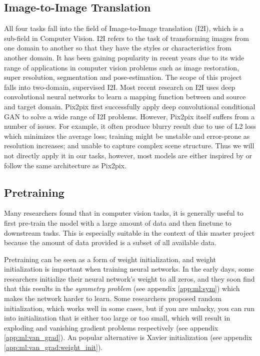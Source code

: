 \subsection{Image-to-Image Translation}
All four tasks fall into the field of Image-to-Image translation (I2I), which is a sub-field in Computer Vision. I2I refers to the task of transforming images from one domain to another so that they have the styles or characteristics from another domain. It has been gaining popularity in recent years due to its wide range of applications in computer vision problems such as image restoration, super resolution, segmentation and pose-estimation. The scope of this project falls into two-domain, supervised I2I\cite{pangImagetoImageTranslationMethods2021}. Most recent research on I2I uses deep convolutional neural networks to learn a mapping function between and source and target domain. Pix2pix\cite{isolaImagetoImageTranslationConditional2018} first successfully apply deep convolutional conditional GAN to solve a wide range of I2I problems. However, Pix2pix itself suffers from a number of issues. For example, it often produce blurry result due to use of L2 loss which minimizes the average loss\cite{wangDiscriminativeRegionProposal2018}; training might be unstable and error-prone as resolution increases\cite{wangHighResolutionImageSynthesis2018}; and unable to capture complex scene structure\cite{tangMultiChannelAttentionSelection2019}. Thus we will not directly apply it in our tasks, however, most models are either inspired by or follow the same architecture as Pix2pix.

\subsection{Pretraining}
Many researchers found that in computer vision tasks, it is generally useful to first pre-train the model with a large amount of data and then finetune to downstream tasks\cite{baoBEiTBERTPreTraining2021, weiMaskedFeaturePrediction2021, newellHowUsefulSelfSupervised2020}. This is especially suitable in the context of this master project because the amount of data provided is a subset of all available data\cite{newellHowUsefulSelfSupervised2020}.

Pretraining can be seen as a form of weight initialization, and weight initialization is important when training neural networks. In the early days, some researchers initialize their neural network's weight to all zeros, and they soon find that this results in the \textit{symmetry problem} (see appendix \ref{app:ml:sym}) which makes the network harder to learn. Some researchers proposed random initialization, which works well in some cases, but if you are unlucky, you can run into initialization that is either too large or too small, which will result in exploding and vanishing gradient problems respectively (see appendix \ref{app:ml:van_grad}). An popular alternative is Xavier initialization\cite{glorotUnderstandingDifficultyTraining2010} (see appendix \ref{app:ml:van_grad:weight_init}).


